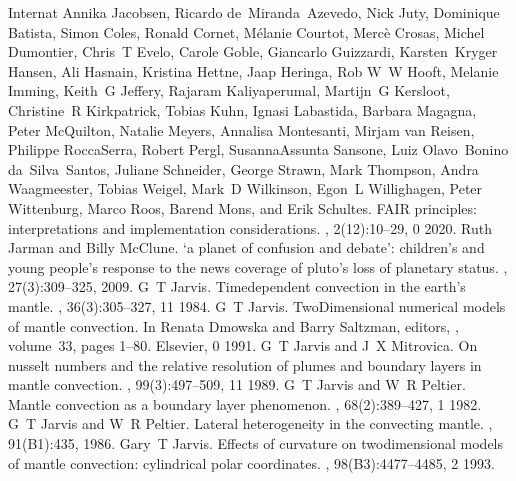 \documentclass[letterpaper,10pt,english]{jupyterBook}
\begin{document}
\begin{sphinxthebibliography}{Internat}
Annika Jacobsen, Ricardo de Miranda Azevedo, Nick Juty, Dominique Batista, Simon Coles, Ronald Cornet, Mélanie Courtot, Mercè Crosas, Michel Dumontier, Chris T Evelo, Carole Goble, Giancarlo Guizzardi, Karsten Kryger Hansen, Ali Hasnain, Kristina Hettne, Jaap Heringa, Rob W W Hooft, Melanie Imming, Keith G Jeffery, Rajaram Kaliyaperumal, Martijn G Kersloot, Christine R Kirkpatrick, Tobias Kuhn, Ignasi Labastida, Barbara Magagna, Peter McQuilton, Natalie Meyers, Annalisa Montesanti, Mirjam van Reisen, Philippe Rocca\sphinxhyphen{}Serra, Robert Pergl, Susanna\sphinxhyphen{}Assunta Sansone, Luiz Olavo Bonino da Silva Santos, Juliane Schneider, George Strawn, Mark Thompson, Andra Waagmeester, Tobias Weigel, Mark D Wilkinson, Egon L Willighagen, Peter Wittenburg, Marco Roos, Barend Mons, and Erik Schultes. FAIR principles: interpretations and implementation considerations. , 2(1\sphinxhyphen{}2):10–29, 0 2020.
\sphinxAtStartPar
Ruth Jarman and Billy McClune. `a planet of confusion and debate': children's and young people's response to the news coverage of pluto's loss of planetary status. , 27(3):309–325, 2009.
\sphinxAtStartPar
G T Jarvis. Time\sphinxhyphen{}dependent convection in the earth's mantle. , 36(3):305–327, 11 1984.
\sphinxAtStartPar
G T Jarvis. Two\sphinxhyphen{}Dimensional numerical models of mantle convection. In Renata Dmowska and Barry Saltzman, editors, , volume 33, pages 1–80. Elsevier, 0 1991.
\sphinxAtStartPar
G T Jarvis and J X Mitrovica. On nusselt numbers and the relative resolution of plumes and boundary layers in mantle convection. , 99(3):497–509, 11 1989.
\sphinxAtStartPar
G T Jarvis and W R Peltier. Mantle convection as a boundary layer phenomenon. , 68(2):389–427, 1 1982.
\sphinxAtStartPar
G T Jarvis and W R Peltier. Lateral heterogeneity in the convecting mantle. , 91(B1):435, 1986.
\sphinxAtStartPar
Gary T Jarvis. Effects of curvature on two\sphinxhyphen{}dimensional models of mantle convection: cylindrical polar coordinates. , 98(B3):4477–4485, 2 1993.

\end{sphinxthebibliography}
\end{document}
